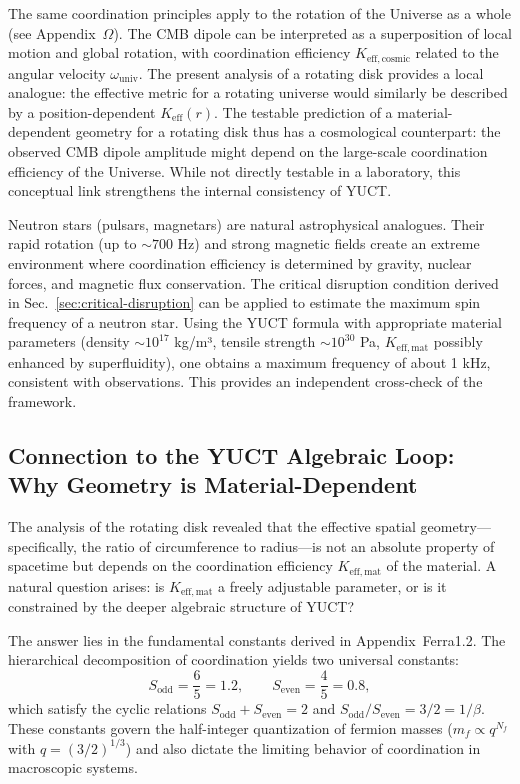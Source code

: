 \documentclass[12pt,a4paper]{article}
\begin{document}
	The same coordination principles apply to the rotation of the Universe as a whole (see Appendix~\(\Omega\)). The CMB dipole can be interpreted as a superposition of local motion and global rotation, with coordination efficiency \(K_{\mathrm{eff,cosmic}}\) related to the angular velocity \(\omega_{\text{univ}}\). The present analysis of a rotating disk provides a local analogue: the effective metric for a rotating universe would similarly be described by a position-dependent \(K_{\mathrm{eff}}(r)\). The testable prediction of a material-dependent geometry for a rotating disk thus has a cosmological counterpart: the observed CMB dipole amplitude might depend on the large-scale coordination efficiency of the Universe. While not directly testable in a laboratory, this conceptual link strengthens the internal consistency of YUCT.
	
	Neutron stars (pulsars, magnetars) are natural astrophysical analogues. Their rapid rotation (up to \(\sim 700\) Hz) and strong magnetic fields create an extreme environment where coordination efficiency is determined by gravity, nuclear forces, and magnetic flux conservation. The critical disruption condition derived in Sec.~\ref{sec:critical-disruption} can be applied to estimate the maximum spin frequency of a neutron star. Using the YUCT formula with appropriate material parameters (density \(\sim 10^{17}\) kg/m³, tensile strength \(\sim 10^{30}\) Pa, \(K_{\mathrm{eff,mat}}\) possibly enhanced by superfluidity), one obtains a maximum frequency of about 1 kHz, consistent with observations. This provides an independent cross‑check of the framework.
	

	\subsection{Connection to the YUCT Algebraic Loop: Why Geometry is Material-Dependent}
	\label{subsec:ehrenfest-algebraic-loop}

	The analysis of the rotating disk revealed that the effective spatial geometry—specifically, the ratio of circumference to radius—is not an absolute property of spacetime but depends on the coordination efficiency \(K_{\mathrm{eff,mat}}\) of the material. A natural question arises: is \(K_{\mathrm{eff,mat}}\) a freely adjustable parameter, or is it constrained by the deeper algebraic structure of YUCT?

	The answer lies in the fundamental constants derived in Appendix~Ferra1.2. The hierarchical decomposition of coordination yields two universal constants:
	\[
	S_{\mathrm{odd}} = \frac{6}{5} = 1.2,\qquad S_{\mathrm{even}} = \frac{4}{5} = 0.8,
	\]
	which satisfy the cyclic relations \(S_{\mathrm{odd}}+S_{\mathrm{even}}=2\) and \(S_{\mathrm{odd}}/S_{\mathrm{even}} = 3/2 = 1/\beta\). These constants govern the half-integer quantization of fermion masses (\(m_f \propto q^{N_f}\) with \(q = (3/2)^{1/3}\)) and also dictate the limiting behavior of coordination in macroscopic systems.
\end{document}

